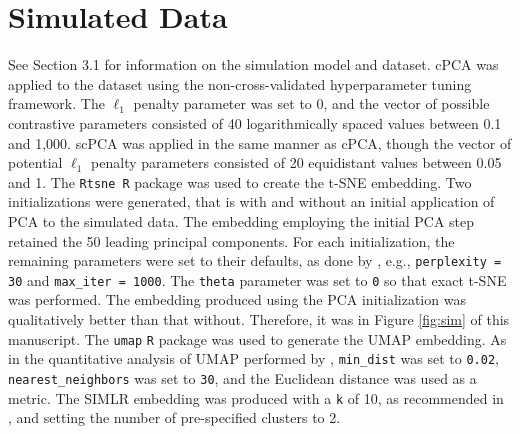 \documentclass{article}
\begin{document}
\FloatBarrier

\newpage

\section{Simulated Data}\label{sup_sim}

See Section 3.1 %
for information on the simulation model and dataset. cPCA was applied to the dataset using the non-cross-validated hyperparameter tuning framework. The $\ell_1$ penalty parameter was set to 0, and the vector of possible contrastive parameters consisted of 40 logarithmically spaced values between 0.1 and 1,000. scPCA was applied in the same manner as cPCA, though the vector of potential $\ell_1$ penalty parameters consisted of 20 equidistant values between 0.05 and 1. The \texttt{Rtsne R} package was used to create the t-SNE embedding. Two initializations were generated, that is with and without an initial application of PCA to the simulated data. The embedding employing the initial PCA step retained the 50 leading principal components. For each initialization, the remaining parameters were set to their defaults, as done by \citet{Becht2019}, e.g., \texttt{perplexity = 30} and \texttt{max\_iter = 1000}. The \texttt{theta} parameter was set to \texttt{0} so that exact t-SNE was performed. The embedding produced using the PCA initialization was qualitatively better than that without. Therefore, it was in Figure \ref{fig:sim} of this manuscript. The \texttt{umap} \texttt{R} package was used to generate the UMAP embedding. As in the quantitative analysis of UMAP performed by \citet{Becht2019}, \texttt{min\_dist} was set to \texttt{0.02}, \texttt{nearest\_neighbors} was set to \texttt{30}, and the Euclidean distance was used as a metric. The SIMLR embedding was produced with a \texttt{k} of 10, as recommended in \citep{Wang2017}, and setting the number of pre-specified clusters to 2.
\end{document}
